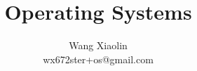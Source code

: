 \usepackage{wx672tut}

\newcommand\strike[1]{#1\hspace{-1.5ex}\rotatebox[x=.5em,y=.3em]{135}{\textcolor{red}{\rule{1em}{1pt}}}}






\AtBeginPart{\frame{\partpage}}

\title{Operating Systems}
\author{Wang Xiaolin\\{\small\ttfamily wx672ster+os@gmail.com}}


